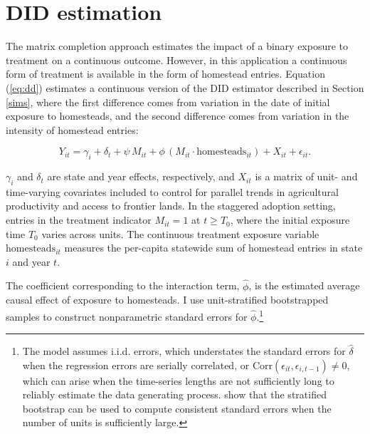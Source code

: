 \documentclass[12pt]{article}
\begin{document}
\section{DID estimation} \label{DID}

The matrix completion approach estimates the impact of a binary exposure to treatment on a continuous outcome. However, in this application a continuous form of treatment is available in the form of homestead entries. Equation (\ref{eq:dd}) estimates a continuous version of the DID estimator described in Section \ref{sims}, where the first difference comes from variation in the date of initial exposure to homesteads, and the second difference comes from variation in the intensity of homestead entries:

\begin{equation} 
Y_{it} =  \gamma_i + \delta_t + \psi \, M_{it} + \phi \, (M_{it} \cdot \text{homesteads}_{it}) + X_{it}  + \epsilon_{it}. \label{eq:dd} 
\end{equation}

\noindent
$\gamma_i$ and $\delta_t$ are state and year effects, respectively, and $X_{it}$ is a matrix of unit- and time-varying covariates included to control for parallel trends in agricultural productivity and access to frontier lands. In the staggered adoption setting, entries in the treatment indicator $M_{it} = 1$ at $t \geq T_0$, where the initial exposure time $T_0$ varies across units. The continuous treatment exposure variable $\text{homesteads}_{it}$ measures the per-capita statewide sum of homestead entries in state $i$ and year $t$.

The coefficient corresponding to the interaction term, $\hat{\phi}$, is the estimated average causal effect of exposure to homesteads. I use unit-stratified bootstrapped samples to construct nonparametric standard errors for $\hat{\phi}$.\footnote{The model assumes i.i.d. errors, which understates the standard errors for $\hat{\delta}$ when the regression errors are serially correlated, or $\mathrm{Corr} (\epsilon_{it}, \epsilon_{i,t-1}) \neq 0$, which can arise when the time-series lengths are not sufficiently long to reliably estimate the data generating process. \citet{bertrand2004much} show that the stratified bootstrap can be used to compute consistent standard errors when the number of units is sufficiently large.} 
\end{document}
